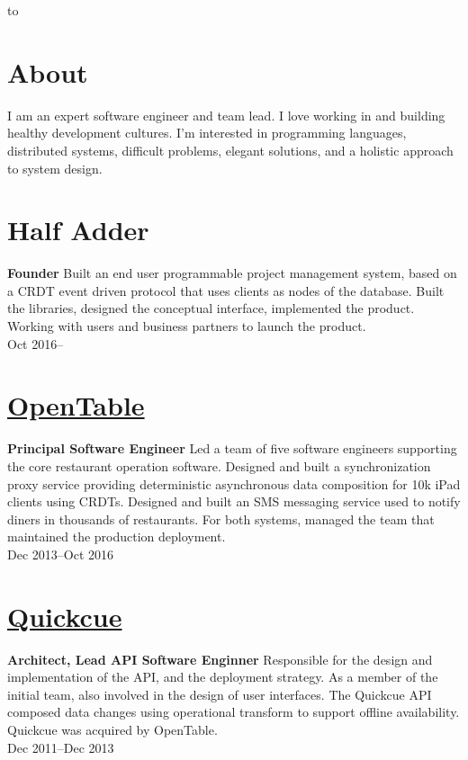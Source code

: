 \documentclass[margin]{res}
\begin{document}

\hbox to 

\begin{resume}
\section{About}

I am an expert software engineer and team lead. I love working in and
building healthy development cultures. I'm interested in programming
languages, distributed systems, difficult problems, elegant solutions,
and a holistic approach to system design.

\section{Half Adder}
{\bf Founder}
%
Built an end user programmable project management system, based on a
CRDT event driven protocol that uses clients as nodes of the database.
Built the libraries, designed the conceptual interface, implemented
the product. Working with users and business partners to launch the
product.\\
%
Oct 2016--

\section{\href{https://opentable.com/}{OpenTable}}
{\bf Principal Software Engineer}
%
Led a team of five software engineers supporting the core restaurant
operation software. Designed and built a synchronization proxy service
providing deterministic asynchronous data composition for 10k iPad
clients using CRDTs. Designed and built an SMS messaging service used
to notify diners in thousands of restaurants. For both systems,
managed the team that maintained the production deployment.\\
%
Dec 2013--Oct 2016

\section{\href{https://quickcue.com/}{Quickcue}}
{\bf Architect, Lead API Software Enginner}
%
Responsible for the design and implementation of the API, and the
deployment strategy. As a member of the initial team, also involved in
the design of user interfaces. The Quickcue API composed data changes
using operational transform to support offline availability. Quickcue
was acquired by OpenTable.\\
%
Dec 2011--Dec 2013


\end{resume}
\end{document}
